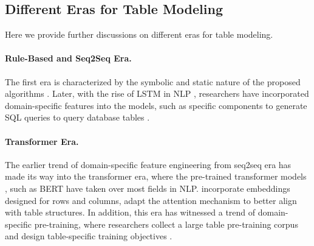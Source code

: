 \documentclass[11pt]{article}
\begin{document}
\subsection{Different Eras for Table Modeling}
\label{app-subsec: different-eras}
Here we provide further discussions on different eras for table modeling.
\paragraph{Rule-Based and Seq2Seq Era.} The first era is characterized by the symbolic and static nature of the proposed algorithms \citep{woods1972lunar, warren-pereira-1982-efficient}.
Later, with the rise of LSTM in NLP \citep{sutskever2014sequence}, researchers have incorporated domain-specific features into the models, such as specific components to generate SQL queries to query database tables \citep{zhong2018seqsql}.
\paragraph{Transformer Era.}
The earlier trend of domain-specific feature engineering from seq2seq era has made its way into the transformer era, where the pre-trained transformer models \citep{vaswani2017attention}, such as BERT \citep{devlin-etal-2019-bert} have taken over most fields in NLP.  
\citet{herzig-etal-2020-tapas} incorporate embeddings designed for rows and columns, 
\citet{yang-etal-2022-tableformer} adapt the attention mechanism to better align with table structures.
In addition, this era has witnessed a trend of domain-specific pre-training, where researchers collect a large table pre-training corpus \citep{yin-etal-2020-tabert} and design table-specific training objectives \citep{yu2021grappa, shi2021learning}.
\end{document}
